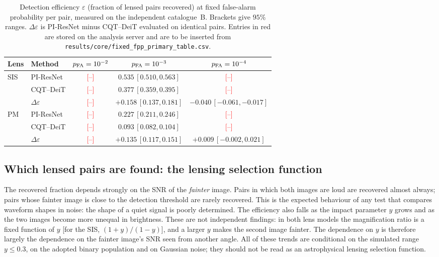 \documentclass[aps,prd,twocolumn,superscriptaddress,nofootinbib,floatfix]{revtex4-2}
\newcommand{\TBD}[1]{\textcolor{red}{[#1]}}
\newcommand{\pfa}{p_{\rm FA}}
\newcommand{\eff}{\varepsilon}
\newcommand{\PIR}{PI-ResNet}
\begin{document}
\begin{table}[t]
\caption{Detection efficiency $\eff$ (fraction of lensed pairs recovered) at fixed false-alarm probability per pair, measured on the independent catalogue~B.
Brackets give $95\%$ ranges.
$\Delta\eff$ is \PIR{} minus CQT--DeiT evaluated on identical pairs.
Entries in red are stored on the analysis server and are to be inserted from \nolinkurl{results/core/fixed_fpp_primary_table.csv}.}
\label{tab:main}
\begin{ruledtabular}
\begin{tabular}{llccc}
Lens & Method & $\pfa=10^{-2}$ & $\pfa=10^{-3}$ & $\pfa=10^{-4}$ \\
\hline
SIS & \PIR{} & \TBD{--} & $0.535\,[0.510,0.563]$ & \TBD{--} \\
    & CQT--DeiT & \TBD{--} & $0.377\,[0.359,0.395]$ & \TBD{--} \\
    & $\Delta\eff$ & \TBD{--} & $+0.158\,[0.137,0.181]$ & $-0.040\,[-0.061,-0.017]$ \\
\hline
PM  & \PIR{} & \TBD{--} & $0.227\,[0.211,0.246]$ & \TBD{--} \\
    & CQT--DeiT & \TBD{--} & $0.093\,[0.082,0.104]$ & \TBD{--} \\
    & $\Delta\eff$ & \TBD{--} & $+0.135\,[0.117,0.151]$ & $+0.009\,[-0.002,0.021]$ \\
\end{tabular}
\end{ruledtabular}
\end{table}

\subsection{Which lensed pairs are found: the lensing selection function}
\label{sec:selection}

The recovered fraction depends strongly on the SNR of the \emph{fainter} image.
Pairs in which both images are loud are recovered almost always; pairs whose fainter image is close to the detection threshold are rarely recovered.
This is the expected behaviour of any test that compares waveform shapes in noise: the shape of a quiet signal is poorly determined.
The efficiency also falls as the impact parameter $y$ grows and as the two images become more unequal in brightness.
These are not independent findings: in both lens models the magnification ratio is a fixed function of $y$ [for the SIS, $(1+y)/(1-y)$], and a larger $y$ makes the second image fainter.
The dependence on $y$ is therefore largely the dependence on the fainter image's SNR seen from another angle.
All of these trends are conditional on the simulated range $y\le0.3$, on the adopted binary population and on Gaussian noise; they should not be read as an astrophysical lensing selection function.
\end{document}
